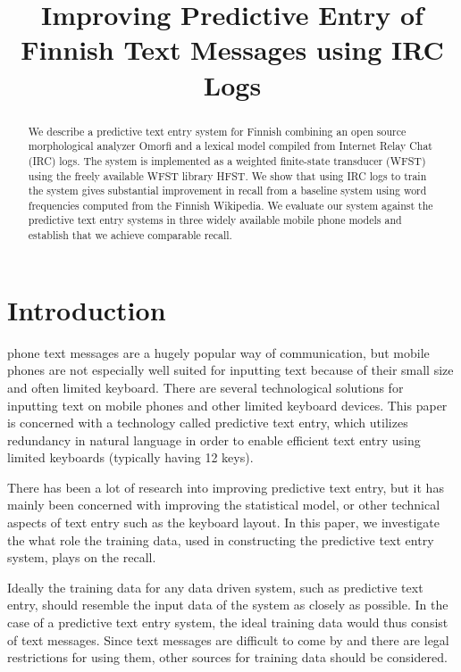 \documentclass[a4paper,conference]{IEEEtran}
\title{Improving Predictive Entry of Finnish Text Messages using IRC Logs}
\author{
\IEEEauthorblockA{\ldots\\
\ldots\\
\ldots\\
\ldots}
\and
\IEEEauthorblockA{\ldots\\
\ldots\\
\ldots\\
\ldots}
\and
\IEEEauthorblockA{\ldots\\
\ldots\\
\ldots\\
\ldots}
}
\begin{document}
\maketitle


\begin{abstract}
We describe a predictive text entry system for Finnish combining an
open source morphological analyzer Omorfi and a lexical model compiled
from Internet Relay Chat (IRC) logs. The system is implemented as a
weighted finite-state transducer (WFST) using the freely available
WFST library HFST. We show that using IRC logs to train the system
gives substantial improvement in recall from a baseline system using
word frequencies computed from the Finnish Wikipedia. We evaluate our
system against the predictive text entry systems in three widely
available mobile phone models and establish that we achieve comparable
recall.
\end{abstract}

\section{Introduction}
\label{sec:introduction}

 phone text messages are a hugely popular way
of communication, but mobile phones are not especially well suited for
inputting text because of their small size and often limited
keyboard. There are several technological solutions for inputting text
on mobile phones and other limited keyboard devices. This paper is
concerned with a technology called predictive text entry, which utilizes
redundancy in natural language in order to enable efficient text entry
using limited keyboards (typically having 12 keys).

There has been a lot of research into improving predictive text entry,
but it has mainly been concerned with improving the statistical model,
or other technical aspects of text entry such as the keyboard
layout. In this paper, we investigate the what role the training data,
used in constructing the predictive text entry system, plays on the
recall.

Ideally the training data for any data driven system, such as
predictive text entry, should resemble the input data of the system as
closely as possible. In the case of a predictive text entry system,
the ideal training data would thus consist of text messages. Since
text messages are difficult to come by and there are legal
restrictions for using them, other sources for training data should be
considered.
\end{document}
